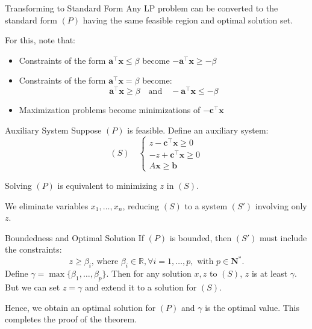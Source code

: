 \documentclass{purdue-slide}
\begin{document}
\begin{frame}{Transforming to Standard Form}
	\quad Any LP problem can be converted to the standard form $(P)$ having the same feasible region and optimal solution set.

	For this, note that:

	\begin{itemize}
		\item Constraints of the form $\mathbf{a}^\top \mathbf{x} \leq \beta$ become $-\mathbf{a}^\top \mathbf{x} \geq -\beta$
		\item Constraints of the form  $\mathbf{a}^\top \mathbf{x} = \beta$ become:
			\[
    \mathbf{a}^\top \mathbf{x} \geq \beta \quad \text{and} \quad -\mathbf{a}^\top \mathbf{x} \leq -\beta
			\]
		\item Maximization problems become minimizations of $-\mathbf{c}^\top \mathbf{x}$
	\end{itemize}
\end{frame}

\begin{frame}{Auxiliary System}
	Suppose $(P)$ is feasible. Define an auxiliary system:
	\[
		(S) \quad
		\begin{cases}
			z - \mathbf{c}^\top \mathbf{x} \geq 0 \\
			-z + \mathbf{c}^\top \mathbf{x} \geq 0 \\
			A\mathbf{x} \geq \mathbf{b}
		\end{cases}
	\]

	\vspace{0.5em}
	Solving $(P)$ is equivalent to minimizing $z$ in $(S)$.

	\vspace{0.5em}
	We eliminate variables $x_1, \dots, x_n$, reducing $(S)$ to a system $(S')$ involving only $z$.
\end{frame}

\begin{frame}{Boundedness and Optimal Solution}
	If $(P)$ is bounded, then $(S')$ must include the constraints:
	\[
		z \geq \beta_i \text{, where } \beta_i \in \mathbb{R}, \forall  i = 1, \dots, p, \text{ with } p \in \mathbf{N^*}.
	\]
	Define $\gamma = \max\{\beta_1, \dots, \beta_p\}$. Then for any solution $x, z$ to $(S)$, $z$ is at least $\gamma$. But we can set $z = \gamma$ and extend it to a solution for $(S)$.

	Hence, we obtain an optimal solution for $(P)$ and $\gamma$ is the optimal value. This completes the proof of the theorem.
\end{frame}
\end{document}
